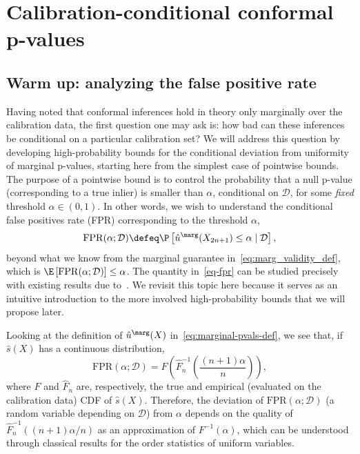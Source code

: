 \section{Calibration-conditional conformal p-values} \label{sec:simult_conformal}

\subsection{Warm up: analyzing the false positive rate} \label{sec:warmup-fpr}

Having noted that conformal inferences hold in theory only marginally over the calibration data, the first question one may ask is: how bad can these inferences be conditional on a particular calibration set?
We will address this question by developing high-probability bounds for the conditional deviation from uniformity of marginal p-values, starting here from the simplest case of pointwise bounds.
The purpose of a pointwise bound is to control the probability that a null p-value (corresponding to a true inlier) is smaller than $\alpha$, conditional on $\mathcal{D}$, for some {\em fixed} threshold $\alpha \in (0,1)$.
In other words, we wish to understand the conditional false positives rate (FPR) corresponding to the threshold $\alpha$,
\begin{equation} \label{eq-fpr}
    \mathrm{FPR}(\alpha; \mathcal{D}) \defeq \P\left[\hat{u}^\marg(X_{2n+1}) \leq \alpha \mid \mathcal{D}\right],
\end{equation}
beyond what we know from the marginal guarantee in~\eqref{eq:marg_validity_def}, which is $\E\left[\mathrm{FPR}(\alpha; \mathcal{D})\right] \le \alpha$.
The quantity in~\eqref{eq-fpr} can be studied precisely with existing results due to~\cite{vovk2012conditional}. We revisit this topic here because it serves as an intuitive introduction to the more involved high-probability bounds that we will propose later.

{Looking at the definition of $\hat{u}^\marg(X)$ in~\eqref{eq:marginal-pvals-def}}, we see that, if $\hat{s}(X)$ has a continuous distribution,
\begin{equation*}
    \mathrm{FPR}(\alpha; \mathcal{D}) = F\left(\hat{F}_n^{-1}\left(\frac{(n + 1) \alpha}{n}\right)\right),
\end{equation*}
{where $F$ and $\hat{F}_n$ are, respectively, the true and empirical (evaluated on the calibration data) CDF of $\hat{s}(X)$.}
Therefore, the deviation of $\mathrm{FPR}(\alpha; \mathcal{D})$ {(a random variable depending on $\mathcal{D}$)} from $\alpha$ depends on the quality of $\hat{F}_n^{-1}((n+1)\alpha/n)$ as an approximation of $F^{-1}(\alpha)$, which can be understood through classical results for the order statistics of uniform variables.

